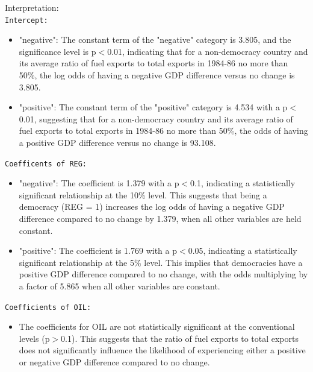 \documentclass[12pt,letterpaper]{article}
\begin{document}
\begin{enumerate}
	\noindent Interpretation:\\
	\texttt{Intercept: }
		\begin{itemize}
			\item "negative": The constant term of the "negative" category is 3.805, and the significance level is p$<$0.01, indicating that for a non-democracy country and its average ratio of fuel exports to total exports in 1984-86 no more than 50\%, the log odds of having a negative GDP difference versus no change is 3.805.

			\item "positive": The constant term of the "positive" category is 4.534 with a p$<$0.01, suggesting that for a non-democracy country and its average ratio of fuel exports to total exports in 1984-86 no more than 50\%, the odds of having a positive GDP difference  versus no change is 93.108.
		\end{itemize}
	
	\texttt{Coefficents of REG: }
		\begin{itemize}
			\item "negative": The coefficient is 1.379 with a p$<$0.1, indicating a statistically significant relationship at the 10\% level. This suggests that being a democracy (REG = 1) increases the log odds of having a negative GDP difference compared to no change by 1.379, when all other variables are held constant.
			
			\item "positive": The coefficient is 1.769 with a p$<$0.05, indicating a statistically significant relationship at the 5\% level. This implies that democracies have a positive GDP difference compared to no change, with the odds multiplying by a factor of 5.865 when all other variables are constant.
		\end{itemize}
		
	\texttt{Coefficients of OIL: }
		\begin{itemize}
			\item The coefficients for OIL are not statistically significant at the conventional levels (p$>$0.1). This suggests that the ratio of fuel exports to total exports does not significantly influence the likelihood of experiencing either a positive or negative GDP difference compared to no change.
		\end{itemize}
		

\end{enumerate}
\end{document}
